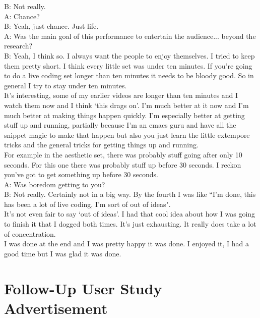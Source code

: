 B: Not really.\\

A: Chance?\\

B: Yeah, just chance. Just life.\\

A: Was the main goal of this performance to entertain the audience... beyond the research?\\

B: Yeah, I think so. I always want the people to enjoy themselves. I tried to keep them pretty short. I think every little set was under ten minutes. If you're going to do a live coding set longer than ten minutes it needs to be bloody good. So in general I try to stay under ten minutes.\\

It's interesting, some of my earlier videos are longer than ten minutes and I watch them now and I think `this drags on'. I'm much better at it now and I'm much better at making things happen quickly. I'm especially better at getting stuff up and running, partially because I'm an emacs guru and have all the snippet magic to make that happen but also you just learn the little extempore tricks and the general tricks for getting things up and running.\\

For example in the aesthetic set, there was probably stuff going after only 10 seconds. For this one there was probably stuff up before 30 seconds. I reckon you've got to get something up before 30 seconds.\\

A: Was boredom getting to you?\\

B: Not really. Certainly not in a big way. By the fourth I was like ``I'm done, this has been a lot of live coding, I'm sort of out of ideas".\\

It's not even fair to say `out of ideas'. I had that cool idea about how I was going to finish it that I dogged both times. It's just exhausting. It really does take a lot of concentration.\\

I was done at the end and I was pretty happy it was done. I enjoyed it, I had a good time but I was glad it was done.\\

\chapter{Follow-Up User Study Advertisement}

